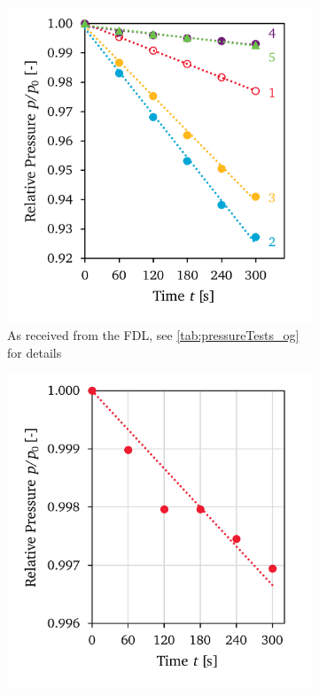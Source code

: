            \begin{figure}[h]
                \centering
                \begin{subfigure}[t]{0.47\textwidth}
                    \centering
                    \includegraphics[width=\textwidth]{assets/3 design/pressureTest_original}
                    \caption{As received from the FDL, see \autoref{tab:pressureTests_og} for details}
                    \label{fig:pressureTest_og}
                \end{subfigure}
                \hfill
                \begin{subfigure}[t]{0.47\textwidth}
                    \centering
                    \includegraphics[width=\textwidth]{assets/3 design/pressureTest_newWindows}

\end{subfigure}
\end{figure}
